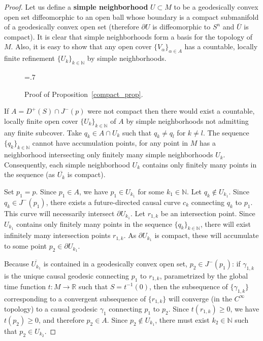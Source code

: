 \documentclass[12pt]{amsart}
\newcommand{\bbR}{\mathbb{R}}      %
\newcommand{\bbN}{\mathbb{N}}      %
\theoremstyle{definition}
\theoremstyle{remark}
\begin{document}
\begin{proof}
Let us define a {\bf simple neighborhood} $U \subset M$ to be a geodesically convex open set diffeomorphic to an open ball whose boundary is a compact submanifold of a geodesically convex open set (therefore $\partial U$ is diffeomorphic to $S^n$ and $\overline{U}$ is compact). It is clear that simple neighborhoods form a basis for the topology of $M$. Also, it is easy to show that any open cover $\{ V_\alpha \}_{\alpha \in A}$ has a countable, locally finite refinement $\{ U_k \}_{k \in \bbN}$ by simple neighborhoods.

\begin{figure}[h!]
\begin{center}
\epsfxsize=.7\textwidth
\leavevmode
{}
\end{center}
\caption{Proof of Proposition~\ref{compact_prop}.} \label{Figure_comp}
\end{figure}

If $A=D^+(S)\cap J^-(p)$ were not compact then there would exist a countable, locally finite open cover $\{ U_k \}_{k \in \bbN}$ of $A$ by simple neighborhoods not admitting any finite subcover. Take $q_k \in A \cap U_k$ such that $q_k \neq q_l$ for $k \neq l$. The sequence $\{ q_k \}_{k \in \bbN}$ cannot have accumulation points, for any point in $M$ has a neighborhood intersecting only finitely many simple neighborhoods $U_k$. Consequently, each simple neighborhood $U_k$ contains only finitely many points in the sequence (as $\overline{U_k}$ is compact).

Set $p_1=p$. Since $p_1 \in A$, we have $p_1 \in U_{k_1}$ for some $k_1 \in \bbN$. Let $q_k \not\in U_{k_1}$. Since $q_k \in J^-(p_1)$, there exists a future-directed causal curve $c_k$ connecting $q_k$ to $p_1$. This curve will necessarily intersect $\partial U_{k_1}$. Let $r_{1,k}$ be an intersection point. Since $U_{k_1}$ contains only finitely many points in the sequence $\{ q_k \}_{k \in \bbN}$, there will exist infinitely many intersection points $r_{1,k}$. As $\partial U_{k_1}$ is compact, these will accumulate to some point $p_2 \in \partial U_{k_1}$.

Because $\overline{U_{k_1}}$ is contained in a geodesically convex open set, $p_2 \in J^-(p_1)$: if $\gamma_{1,k}$ is the unique causal geodesic connecting $p_1$ to $r_{1,k}$, parametrized by the global time function $t:M \to \bbR$ such that $S=t^{-1}(0)$, then the subsequence of $\{\gamma_{1,k}\}$ corresponding to a convergent subsequence of $\{r_{1,k}\}$ will converge (in the $C^\infty$ topology) to a causal geodesic $\gamma_1$ connecting $p_1$ to $p_2$. Since $t(r_{1,k}) \geq 0$, we have $t(p_2) \geq 0$, and therefore $p_2 \in A$. Since $p_2 \not\in U_{k_1}$, there must exist $k_2 \in \bbN$ such that $p_2 \in U_{k_2}$. 


\end{proof}
\end{document}
